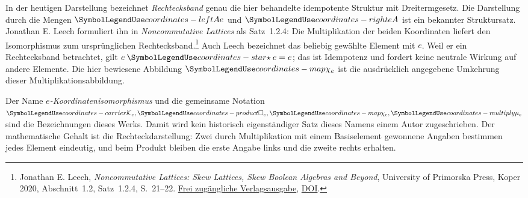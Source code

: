 In der heutigen Darstellung bezeichnet \emph{Rechtecksband} genau
die hier behandelte idempotente Struktur mit Dreitermgesetz.
Die Darstellung durch die Mengen \(\CRLeft\) und \(\CRRight\) ist ein
bekannter Struktursatz. Jonathan E. Leech formuliert ihn in
\emph{Noncommutative Lattices} als Satz~1.2.4: Die Multiplikation
der beiden Koordinaten liefert den Isomorphismus zum ursprünglichen
Rechtecksband.\footnote{Jonathan E. Leech,
\emph{Noncommutative Lattices: Skew Lattices, Skew Boolean Algebras
and Beyond}, University of Primorska Press, Koper 2020,
Abschnitt~1.2, Satz~1.2.4, S.~21--22.
\href{https://www.hippocampus.si/ISBN/978-961-293-027-1.pdf}{Frei zugängliche Verlagsausgabe},
\href{https://doi.org/10.26493/978-961-293-027-1}{DOI}.}
Auch Leech bezeichnet das beliebig gewählte Element mit \(e\).
Weil er ein Rechtecksband betrachtet, gilt \(e\CRStar e=e\);
das ist Idempotenz und fordert keine neutrale Wirkung auf andere
Elemente.
Die hier bewiesene Abbildung \(\CRChi\) ist die ausdrücklich
angegebene Umkehrung dieser Multiplikationsabbildung.

Der Name \emph{\(e\)-Koordinatenisomorphismus} und die gemeinsame
Notation \(\CRK,\CRSquare,\CRChi,\CRMu\) sind die Bezeichnungen
dieses Werks. Damit wird kein historisch eigenständiger Satz dieses
Namens einem Autor zugeschrieben. Der mathematische Gehalt ist die
Rechteckdarstellung: Zwei durch Multiplikation mit einem Basiselement
gewonnene Angaben bestimmen jedes Element eindeutig, und beim Produkt
bleiben die erste Angabe links und die zweite rechts erhalten.
